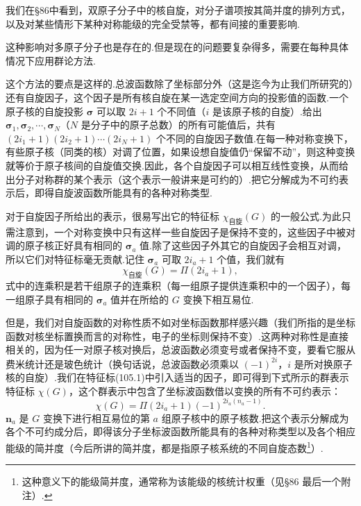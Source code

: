 我们在§86中看到，双原子分子中的核自旋，对分子谱项按其简并度的排列方式，以及对某些情形下某种对称能级的完全受禁等，都有间接的重要影响.

这种影响对多原子分子也是存在的.但是现在的问题要复杂得多，需要在每种具体情况下应用群论方法.

这个方法的要点是这样的.总波函数除了坐标部分外（这是迄今为止我们所研究的）还有自旋因子，这个因子是所有核自旋在某一选定空间方向的投影值的函数.一个原子核的自旋投影 $\boldsymbol{\sigma}$ 可以取 $2i+1$ 个不同值（$i$ 是该原子核的自旋）.给出 $\boldsymbol{\sigma}_1,\boldsymbol{\sigma}_2,\cdots,\boldsymbol{\sigma}_N$（$N$ 是分子中的原子总数）的所有可能值后，共有 $(2i_1+1)(2i_2+1)\cdots(2i_N+1)$ 个不同的自旋因子数值.在每一种对称变换下，有些原子核（同类的核）对调了位置，如果设想自旋值仍“保留不动”，则这种变换就等价于原子核间的自旋值交换.因此，各个自旋因子可以相互线性变换，从而给出分子对称群的某个表示（这个表示一般讲来是可约的）.把它分解成为不可约表示后，即得自旋波函数所能具有的各种对称类型.

对于自旋因子所给出的表示，很易写出它的特征标 $\chi_{\text{自旋}}(G)$ 的一般公式.为此只需注意到，一个对称变换中只有这样一些自旋因子是保持不变的，这些因子中被对调的原子核正好具有相同的 $\boldsymbol{\sigma}_a$ 值.除了这些因子外其它的自旋因子会相互对调，所以它们对特征标毫无贡献.记住 $\boldsymbol{\sigma}_a$ 可取 $2i_a+1$ 个值，我们就有
\begin{equation}
  \chi_{\text{自旋}}(G)=\Pi(2i_a+1),
\end{equation}
式中的连乘积是若干组原子的连乘积（每一组原子提供连乘积中的一个因子），每一组原子具有相同的 $\boldsymbol{\sigma}_a$ 值并在所给的 $G$ 变换下相互易位.

但是，我们对自旋函数的对称性质不如对坐标函数那样感兴趣（我们所指的是坐标函数对核坐标置换而言的对称性，电子的坐标则保持不变）.这两种对称性是直接相关的，因为任一对原子核对换后，总波函数必须变号或者保持不变，要看它服从费米统计还是玻色统计（换句话说，总波函数必须乘以 $(-1)^{2i}$，$i$ 是所对换原子核的自旋）.我们在特征标(105.1)中引入适当的因子，即可得到下式所示的群表示特征标 $\chi(G)$，这个群表示中包含了坐标波函数借以变换的所有不可约表示：
\begin{equation}
  \chi(G)=\Pi(2i_a+1)(-1)^{2i_a(n_a-1)}.
\end{equation}
$\boldsymbol{n}_a$ 是 $G$ 变换下进行相互易位的第 $a$ 组原子核中的原子核数.把这个表示分解成为各个不可约成分后，即得该分子坐标波函数所能具有的各种对称类型以及各个相应能级的简并度（今后所讲的简并度，都是指原子核系统的不同自旋态数\footnote{这种意义下的能级简并度，通常称为该能级的核统计权重（见§86 最后一个附注）.}）.

